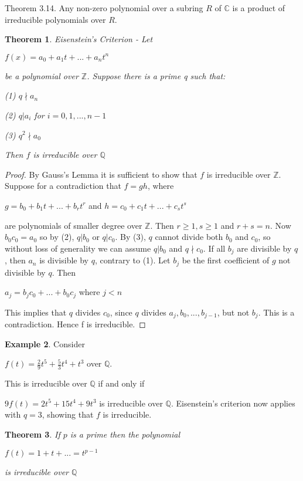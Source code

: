 \documentclass[12pt]{article}
\newtheorem{theorem}{Theorem}
\theoremstyle{definition}
\newtheorem{example}[theorem]{Example}
\newcommand{\Z}{\mathbb Z}
\newcommand{\Q}{\mathbb Q}
\begin{document}
Theorem 3.14. Any non-zero polynomial over a subring $R$ of $\mathbb{C}$ is a product of irreducible polynomials over $R$.



\begin{theorem}
    Eisenstein's Criterion - Let 
    
    $f(x) = a_0 + a_1 t + ... + a_n t^n$
    
    be a polynomial over $\Z$. Suppose there is a prime q such that:
    
    (1) $q \nmid a_n$

    (2) $q | a_i$ for $i = {0, 1,..., n-1}$

    (3) $q^2 \nmid a_0$

    Then $f$ is irreducible over $\Q$
\end{theorem}

\begin{proof}
By Gauss's Lemma it is sufficient to show that $f$ is irreducible over $\Z$. Suppose for a contradiction that $f = gh$, where

$g=b_0+b_1 t+ ... +b_r t^r$ and $h=c_0+c_1 t+ ... +c_s t^s$

are polynomials of smaller degree over $\Z$. Then $r \ge 1, s \ge 1$ and $r+s = n$. Now $b_0 c_0 = a_0$ so by (2), $q | b_0$ or $q|c_0$. By (3), $q$ cannot divide both $b_0$ and $c_0$, so without
loss of generality we can assume $q | b_0$ and $q \nmid c_0$. If all $b_j$ are divisible by $q$, then $a_n$ is divisible by $q$, contrary to (1). Let $b_j$ be the first coefficient of $g$ not divisible by $q$. Then

$a_j = b_j c_0 + ...+ b_0 c_j$ where $j < n$

 This implies that $q$ divides $c_0$, since $q$ divides $a_j, b_0,..., b_{j-1}$, but not $b_j$. This is a contradiction. Hence f is irreducible.
\end{proof}

\begin{example}
Consider

$f(t) = \frac{2}{9} t^5 + \frac{5}{3} t^4 + t^3$ over $\Q$.

This is irreducible over $\Q$ if and only if

$9f(t) = 2t^5 + 15t^4 + 9t^3$ is irreducible over $\Q$. Eisenstein's criterion now applies with $q = 3$, showing that $f$ is irreducible.
\end{example}

\begin{theorem}
    If $p$ is a prime then the polynomial

    $f(t) = 1 + t + ... = t^{p-1}$

    is irreducible over $\Q$
\end{theorem}
\end{document}
